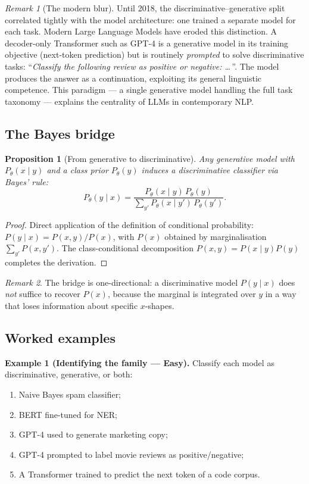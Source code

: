 \documentclass[12pt,a4paper]{report}
\newtheorem{proposition}[theorem]{Proposition}
\theoremstyle{definition}
\theoremstyle{remark}
\newtheorem{remark}{Remark}[section]
\begin{document}
\begin{remark}[The modern blur]
Until 2018, the discriminative--generative split correlated tightly with the model architecture: one trained a separate model for each task. Modern Large Language Models have eroded this distinction. A decoder-only Transformer such as GPT-4 is a generative model in its training objective (next-token prediction) but is routinely \emph{prompted} to solve discriminative tasks: ``\emph{Classify the following review as positive or negative: \dots\,}''. The model produces the answer as a continuation, exploiting its general linguistic competence. This paradigm --- a single generative model handling the full task taxonomy --- explains the centrality of LLMs in contemporary NLP.
\end{remark}

\subsection{The Bayes bridge}

\begin{proposition}[From generative to discriminative]
Any generative model with $P_\theta(x \mid y)$ and a class prior $P_\theta(y)$ induces a discriminative classifier via Bayes' rule:
\[ P_\theta(y \mid x) = \frac{P_\theta(x \mid y)\, P_\theta(y)}{\sum_{y'} P_\theta(x \mid y')\, P_\theta(y')}. \]
\end{proposition}

\begin{proof}
Direct application of the definition of conditional probability: $P(y \mid x) = P(x, y) / P(x)$, with $P(x)$ obtained by marginalisation $\sum_{y'} P(x, y')$. The class-conditional decomposition $P(x, y) = P(x \mid y) P(y)$ completes the derivation.
\end{proof}

\begin{remark}
The bridge is one-directional: a discriminative model $P(y \mid x)$ does \emph{not} suffice to recover $P(x)$, because the marginal is integrated over $y$ in a way that loses information about specific $x$-shapes.
\end{remark}

\subsection{Worked examples}

\textbf{Example 1 (Identifying the family --- Easy).}
Classify each model as discriminative, generative, or both:
\begin{enumerate}
    \item Naive Bayes spam classifier;
    \item BERT fine-tuned for NER;
    \item GPT-4 used to generate marketing copy;
    \item GPT-4 prompted to label movie reviews as positive/negative;
    \item A Transformer trained to predict the next token of a code corpus.
\end{enumerate}
\end{document}
